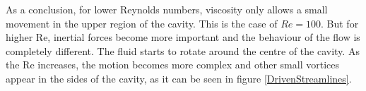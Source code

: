 As a conclusion, for lower Reynolds numbers, viscosity only allows a small movement in the upper region of the cavity. This is the case of $Re=100$. But for higher Re, inertial forces become more important and the behaviour of the flow is completely different. The fluid starts to rotate around the centre of the cavity. As the Re increases, the motion becomes more complex and other small vortices appear in the sides of the cavity, as it can be seen in figure \ref{DrivenStreamlines}.